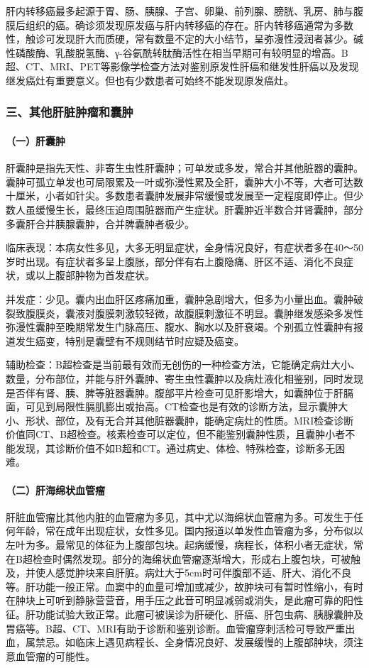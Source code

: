 肝内转移癌最多起源于胃、肠、胰腺、子宫、卵巢、前列腺、膀胱、乳房、肺与腹膜后组织的癌。确诊须发现原发癌与肝内转移癌的存在。肝内转移癌通常为多数性，触诊可发现肝大而质硬，常有数量不定的大小结节，呈弥漫性浸润者甚少。碱性磷酸酶、乳酸脱氢酶、γ-谷氨酰转肽酶活性在相当早期可有较明显的增高。B超、CT、MRI、PET等影像学检查方法对鉴别原发性肝癌和继发性肝癌以及发现继发癌灶有重要意义。但也有少数患者可始终不能发现原发癌灶。

\subsubsection{三、其他肝脏肿瘤和囊肿}

\paragraph{（一）肝囊肿}

肝囊肿是指先天性、非寄生虫性肝囊肿；可单发或多发，常合并其他脏器的囊肿。囊肿可孤立单发也可局限累及一叶或弥漫性累及全肝，囊肿大小不等，大者可达数十厘米，小者如针尖。多数患者囊肿发展非常缓慢或发展至一定程度即停止。但少数人虽缓慢生长，最终压迫周围脏器而产生症状。肝囊肿近半数合并肾囊肿，部分多囊肝合并胰腺囊肿，合并脾囊肿者极少。

临床表现：本病女性多见，大多无明显症状，全身情况良好，有症状者多在40～50岁时出现。有症状者多呈上腹胀，部分伴有右上腹隐痛、肝区不适、消化不良症状，或以上腹部肿物为首发症状。

并发症：少见。囊内出血肝区疼痛加重，囊肿急剧增大，但多为小量出血。囊肿破裂致腹膜炎，囊液对腹膜刺激较轻微，故腹膜刺激征不明显。囊肿继发感染多发性弥漫性囊肿至晚期常发生门脉高压、腹水、胸水以及肝衰竭。个别孤立性囊肿有报道发生癌变，特别是囊壁有不规则结节时应疑及癌变。

辅助检查：B超检查是当前最有效而无创伤的一种检查方法，它能确定病灶大小、数量，分布部位，并能与肝外囊肿、寄生虫性囊肿以及病灶液化相鉴别，同时发现是否伴有肾、胰、脾等脏器囊肿。腹部平片检查可见肝影增大，如囊肿位于肝膈面，可见到局限性膈肌膨出或抬高。CT检查也是有效的诊断方法，显示囊肿大小、形状、部位，及有无合并其他脏器囊肿，能确定病灶的性质。MRI检查诊断价值同CT、B超检查。核素检查可以定位，但不能鉴别囊肿性质，且囊肿小者不能发现，其诊断价值不如B超和CT。通过病史、体检、特殊检查，诊断多无困难。

\paragraph{（二）肝海绵状血管瘤}

肝脏血管瘤比其他内脏的血管瘤为多见，其中尤以海绵状血管瘤为多。可发生于任何年龄，常在成年出现症状，女性多见。国内报道以单发性血管瘤为多，分布似以左叶为多。最常见的体征为上腹部包块。起病缓慢，病程长，体积小者无症状，常在B超检查时偶然发现。部分的海绵状血管瘤逐渐增大，形成右上腹包块，可被触及，并使人感觉肿块来自肝脏。病灶大于5cm时可伴腹部不适、肝大、消化不良等。肝功能一般正常。血窦中的血量可增加或减少，故肿块可有暂时性缩小，有时在肿块上可听到静脉营营音，用手压之此音可明显减弱或消失，是此瘤可靠的阳性征。肝功能试验大致正常。此瘤可被误诊为肝硬化、肝癌、肝包虫病、胰腺囊肿及胃癌等。B超、CT、MRI有助于诊断和鉴别诊断。血管瘤穿刺活检可导致严重出血，属禁忌。如临床上遇见病程长、全身情况良好、发展缓慢的上腹部肿块，须注意血管瘤的可能性。

